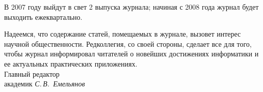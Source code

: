 {{\hspace*{5mm}В 2007 году выйдут в свет 2 выпуска журнала; начиная с 2008 года
журнал будет выходить ежеквартально.

\hspace*{5mm}Надеемся, что содержание статей, помещаемых в журнале, вызовет
интерес научной общественности. Редколлегия, со своей стороны, сделает все для
того, чтобы журнал информировал читателей о новейших достижениях информатики и
ее
актуальных практических приложениях.\\

\noindent
Главный редактор\\[2pt]
академик  \hfill
\textit{С.\,В.~Емельянов}

} }